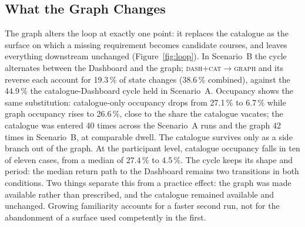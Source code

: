 \documentclass[a4paper,twoside]{article}
\newcommand{\st}[1]{\textsc{#1}}
\begin{document}
\subsection{What the Graph Changes}

The graph alters the loop at exactly one point: it replaces the catalogue as the surface on which a missing requirement becomes candidate courses, and leaves everything downstream unchanged (Figure~\ref{fig:loop}). In Scenario~B the cycle alternates between the Dashboard and the graph; \st{dash+cat}$\rightarrow$\st{graph} and its reverse each account for 19.3\,\% of state changes (38.6\,\% combined), against the 44.9\,\% the catalogue-Dashboard cycle held in Scenario~A. Occupancy shows the same substitution: catalogue-only occupancy drops from 27.1\,\% to 6.7\,\% while graph occupancy rises to 26.6\,\%, close to the share the catalogue vacates; the catalogue was entered 40 times across the Scenario~A runs and the graph 42 times in Scenario~B, at comparable dwell. The catalogue survives only as a side branch out of the graph. At the participant level, catalogue occupancy falls in ten of eleven cases, from a median of 27.4\,\% to 4.5\,\%. The cycle keeps its shape and period: the median return path to the Dashboard remains two transitions in both conditions. Two things separate this from a practice effect: the graph was made available rather than prescribed, and the catalogue remained available and unchanged. Growing familiarity accounts for a faster second run, not for the abandonment of a surface used competently in the first.
\end{document}
